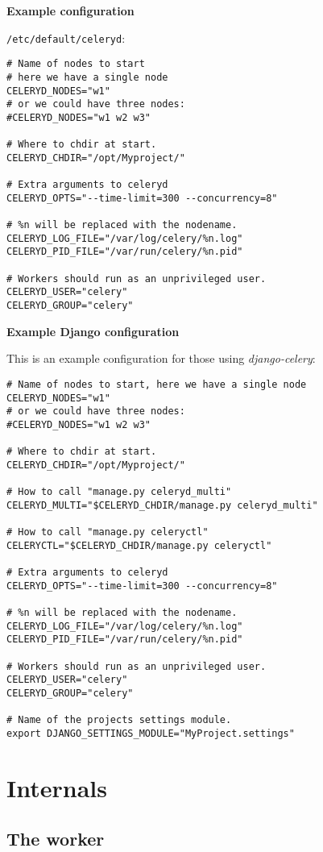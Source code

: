 \documentclass[9pt,a4paper]{article}
\begin{document}
\begin{CJK*}{GBK}{kai}
\textbf{Example configuration}

\verb"/etc/default/celeryd":

\begin{Verbatim}[frame=single]
# Name of nodes to start
# here we have a single node
CELERYD_NODES="w1"
# or we could have three nodes:
#CELERYD_NODES="w1 w2 w3"

# Where to chdir at start.
CELERYD_CHDIR="/opt/Myproject/"

# Extra arguments to celeryd
CELERYD_OPTS="--time-limit=300 --concurrency=8"

# %n will be replaced with the nodename.
CELERYD_LOG_FILE="/var/log/celery/%n.log"
CELERYD_PID_FILE="/var/run/celery/%n.pid"

# Workers should run as an unprivileged user.
CELERYD_USER="celery"
CELERYD_GROUP="celery"
\end{Verbatim}

\textbf{Example Django configuration}

This is an example configuration for those using \textit{django-celery}:

\begin{Verbatim}[frame=single]
# Name of nodes to start, here we have a single node
CELERYD_NODES="w1"
# or we could have three nodes:
#CELERYD_NODES="w1 w2 w3"

# Where to chdir at start.
CELERYD_CHDIR="/opt/Myproject/"

# How to call "manage.py celeryd_multi"
CELERYD_MULTI="$CELERYD_CHDIR/manage.py celeryd_multi"

# How to call "manage.py celeryctl"
CELERYCTL="$CELERYD_CHDIR/manage.py celeryctl"

# Extra arguments to celeryd
CELERYD_OPTS="--time-limit=300 --concurrency=8"

# %n will be replaced with the nodename.
CELERYD_LOG_FILE="/var/log/celery/%n.log"
CELERYD_PID_FILE="/var/run/celery/%n.pid"

# Workers should run as an unprivileged user.
CELERYD_USER="celery"
CELERYD_GROUP="celery"

# Name of the projects settings module.
export DJANGO_SETTINGS_MODULE="MyProject.settings"
\end{Verbatim}

\section{Internals}

\subsection{The worker}


\end{CJK*}
\end{document}
